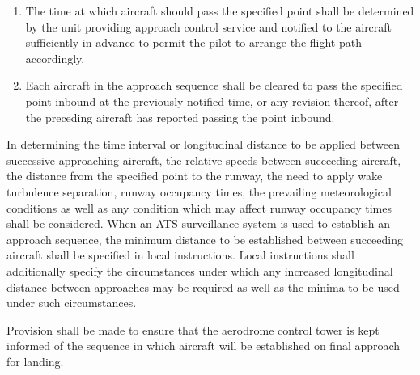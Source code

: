 \begin{enumeratesc}
\begin{enumeratescit}
\begin{enumerate}
            \item The time at which aircraft should pass the specified point shall be determined by the unit providing approach control service and notified to the aircraft sufficiently in advance to permit the pilot to arrange the flight path accordingly.
            \item Each aircraft in the approach sequence shall be cleared to pass the specified point inbound at the previously notified time, or any revision thereof, after the preceding aircraft has reported passing the point inbound.
        \end{enumerate}


        \noindent In determining the time interval or longitudinal distance to be applied between successive approaching aircraft, the relative speeds between succeeding aircraft, the distance from the specified point to the runway, the need to apply wake turbulence separation, runway occupancy times, the prevailing meteorological conditions as well as any condition which may affect runway occupancy times shall be considered. When an ATS surveillance system is used to establish an approach sequence, the minimum distance to be established between succeeding aircraft shall be specified in local instructions. Local instructions shall additionally specify the circumstances under which any increased longitudinal distance between approaches may be required as well as the minima to be used under such circumstances.


        \noindent Provision shall be made to ensure that the aerodrome control tower is kept informed of the sequence in which aircraft will be established on final approach for landing.
    \end{enumeratescit}
\end{enumeratesc}

